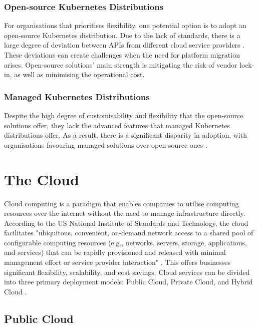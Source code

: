 \subsubsection{Open-source Kubernetes Distributions}

For organisations that prioritises flexibility, one potential option is to adopt an open-source Kubernetes distribution. Due to the lack of standards, there is a large degree of deviation between APIs from different cloud service providers \cite{truyen_managing_2020, pellegrini_preventing_2017}. These deviations can create challenges when the need for platform migration arises. Open-source solutions' main strength is mitigating the risk of vendor lock-in, as well as minimising the operational cost.

\subsubsection{Managed Kubernetes Distributions}

Despite the high degree of customisability and flexibility that the open-source solutions offer, they lack the advanced features that managed Kubernetes distributions offer. As a result, there is a significant disparity in adoption, with organisations favouring managed solutions over open-source ones \cite{red_hat_inc_state_2024}.


\section{The Cloud}

Cloud computing is a paradigm that enables companies to utilise computing resources over the internet without the need to manage infrastructure directly. According to the US National Institute of Standards and Technology, the cloud facilitates "ubiquitous, convenient, on-demand network access to a shared pool of configurable computing resources (e.g., networks, servers, storage, applications, and services) that can be rapidly provisioned and released with minimal management effort or service provider interaction" \cite{editor_cloud_nodate}. This offers businesses significant flexibility, scalability, and cost savings. Cloud services can be divided into three primary deployment models: Public Cloud, Private Cloud, and Hybrid Cloud \cite{jadeja_cloud_2012}.

\subsection{Public Cloud}

